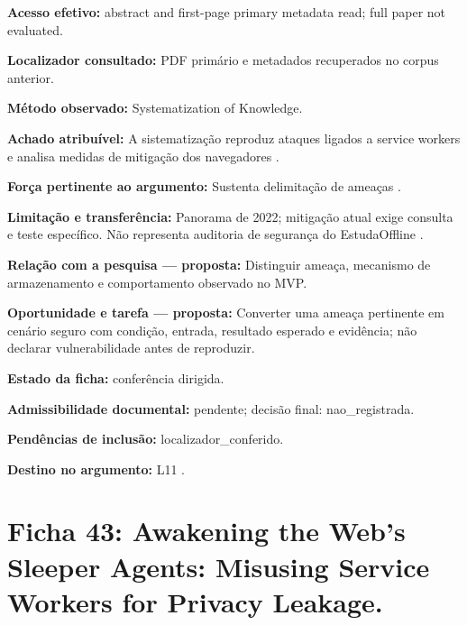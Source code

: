 \noindent\textbf{Acesso efetivo:} abstract and first-page primary metadata read; full paper not evaluated.\par\medskip

\noindent\textbf{Localizador consultado:} PDF primário e metadados recuperados no corpus anterior.\par\medskip

\noindent\textbf{Método observado:} Systematization of Knowledge.\par\medskip

\noindent\textbf{Achado atribuível:} A sistematização reproduz ataques ligados a service workers e analisa medidas de mitigação dos navegadores \citep{OS02}.\par\medskip

\noindent\textbf{Força pertinente ao argumento:} Sustenta delimitação de ameaças \citep{OS02}.\par\medskip

\noindent\textbf{Limitação e transferência:} Panorama de 2022; mitigação atual exige consulta e teste específico. Não representa auditoria de segurança do EstudaOffline \citep{OS02}.\par\medskip

\noindent\textbf{Relação com a pesquisa — proposta:} Distinguir ameaça, mecanismo de armazenamento e comportamento observado no MVP.\par\medskip

\noindent\textbf{Oportunidade e tarefa — proposta:} Converter uma ameaça pertinente em cenário seguro com condição, entrada, resultado esperado e evidência; não declarar vulnerabilidade antes de reproduzir.\par\medskip

\noindent\textbf{Estado da ficha:} conferência dirigida.\par\medskip

\noindent\textbf{Admissibilidade documental:} pendente; decisão final: nao\_registrada.\par\medskip

\noindent\textbf{Pendências de inclusão:} localizador\_conferido.\par\medskip

\noindent\textbf{Destino no argumento:} L11 .

\clearpage\section*{Ficha 43: Awakening the Web's Sleeper Agents: Misusing Service Workers for Privacy Leakage.}

